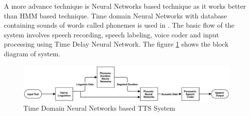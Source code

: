 

A more advance technique is Neural Networks based technique as it works better than HMM based technique. Time domain Neural Networks with database containing sounds of words called phonemes is used in \cite{karaali1998text}. The basic flow of the system involves speech recording, speech labeling, voice coder and input processing using Time Delay Neural Network. The figure \ref{fig:Time Domain Neural Networks based TTS System} shows the block diagram of system.

\begin{center}
	\begin{figure}[hbtp]
		\centering
		\includegraphics[width=\linewidth]{images/time_domain_neural_network.jpg}
		\caption{Time Domain Neural Networks based TTS System}
		\label{fig:Time Domain Neural Networks based TTS System}
	\end{figure}
\end{center}

